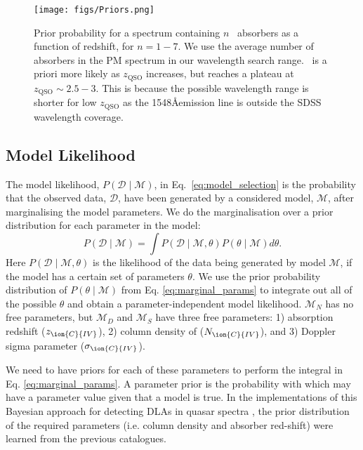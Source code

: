 \documentclass[fleqn,usenatbib]{mnras}
\newcommand{\civ}{\ion{C}{IV}}
\newcommand{\nciv}{N_{\civ}} %
\newcommand{\zciv}{z_{\civ}}
\newcommand{\sciv}{\sigma_{\civ}}
\newcommand{\zqso}{z_{\textrm{QSO}}}
\newcommand{\Data}{\mathcal{D}}
\newcommand{\model}{\mathcal{M}}
\newcommand{\rmon}[1]{\textcolor{rez}{[\bf RM: #1]}}
\begin{document}

\begin{figure}
  \texttt{[image: figs/Priors.png]}
\caption{Prior probability %
for a spectrum containing $n$ \civ\ absorbers as a function of redshift, for $n = 1 - 7$. We use the average number of absorbers in the PM spectrum in our wavelength search range.
\civ~is a priori more likely as $\zqso$
increases, but reaches a plateau at $\zqso \sim 2.5-3$.
This is because the possible wavelength range
is shorter for low $\zqso$ as the 1548\AA emission
line is outside the SDSS wavelength coverage.}
\label{fig:prior}
\end{figure}

\subsection{Model Likelihood}
\label{sec:model_likelihood}

The model likelihood, $P(\Data \mid \model)$, in Eq.~\ref{eq:model_selection} is
the probability that the observed data, $\Data$, have
been generated by a considered model, $\model$, after marginalising
the model parameters.
We do the marginalisation over a prior distribution for each parameter in the model:
\begin{equation}
   P(\Data \mid \model) =
   \int P(\Data \mid \model, \theta) P(\theta \mid \model) d\theta.
   \label{eq:marginal_params}
\end{equation}
Here $P(\Data \mid \model, \theta)$ is the likelihood of the data being generated
by model $\model$, if the model has a certain set of parameters $\theta$. We
use the prior probability distribution of $P(\theta \mid \model)$ from Eq. \ref{eq:marginal_params}
to integrate out all of the possible $\theta$ and obtain a
parameter-independent model likelihood. $\model_{N}$ has no
free parameters, but $\model_D$ and $\model_S$ have three free parameters:
1) absorption redshift ($\zciv$), 2) column density of \civ ($\nciv$), and 3) Doppler sigma parameter ($\sciv$).

We need to have priors for each of these
parameters to
perform the integral in Eq. \ref{eq:marginal_params}.
A parameter prior is the probability with which may have a parameter value
given that a model is true.
In the
implementations of this Bayesian approach for detecting DLAs in quasar spectra \citep{mfDLA, mfDLA16},
the prior distribution of the required parameters (i.e. column density and absorber red-shift)
  were learned from the previous catalogues.
\end{document}
